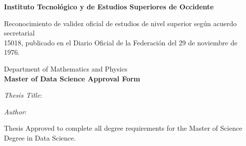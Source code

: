 \begin{fullwidth}
    \begin{center}
        \LARGE
        \textcolor{itesodblue}{\textbf{Instituto Tecnol\'ogico y de Estudios Superiores de Occidente}}\\
        
        \vspace*{0.1cm}
        
        \normalsize
        \textcolor{itesodblue}{Reconocimiento de validez oficial de estudios de nivel superior según acuerdo secretarial \\15018, publicado en el Diario Oficial de la Federación del 29 de noviembre de 1976.}\\
        
        \vspace*{0.5cm}
        
        \LARGE
        \textcolor{itesodblue}{Department of Mathematics and Physics}\\
        \textcolor{itesodblue}{\textbf{Master of Data Science Approval Form}}
        
        \vspace*{1cm}
        
        \LARGE
        \textcolor{itesodblue}{\textit{Thesis Title}: \textbf{\mytitle}}
        
        \textcolor{itesodblue}{\textit{Author}: \textbf{\myauthor}}
        
        \Large
        \textcolor{itesodblue}{Thesis Approved to complete all degree requirements for the Master of Science Degree in Data Science.}
        

\end{center}
\end{fullwidth}
